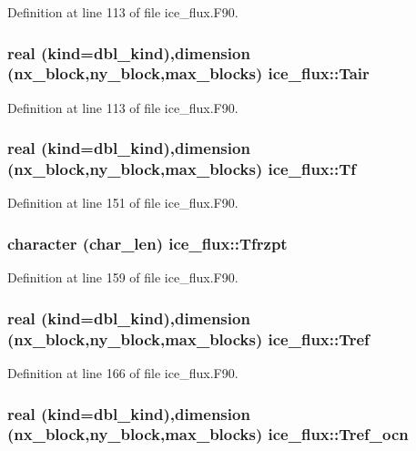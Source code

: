 Definition at line 113 of file ice\_\-flux.F90.\hypertarget{namespaceice__flux_add98ec71fa0c35dbd9a7afcfa897081d}{
\subsubsection[{Tair}]{\setlength{\rightskip}{0pt plus 5cm}real (kind=dbl\_\-kind),dimension (nx\_\-block,ny\_\-block,max\_\-blocks) {\bf ice\_\-flux::Tair}}}
\label{namespaceice__flux_add98ec71fa0c35dbd9a7afcfa897081d}


Definition at line 113 of file ice\_\-flux.F90.\hypertarget{namespaceice__flux_a3facf6772fad8bd7af98c69cd56db10c}{
\subsubsection[{Tf}]{\setlength{\rightskip}{0pt plus 5cm}real (kind=dbl\_\-kind),dimension (nx\_\-block,ny\_\-block,max\_\-blocks) {\bf ice\_\-flux::Tf}}}
\label{namespaceice__flux_a3facf6772fad8bd7af98c69cd56db10c}


Definition at line 151 of file ice\_\-flux.F90.\hypertarget{namespaceice__flux_a230173f0ff542e8f4cdc68f1c6a469f9}{
\subsubsection[{Tfrzpt}]{\setlength{\rightskip}{0pt plus 5cm}character (char\_\-len) {\bf ice\_\-flux::Tfrzpt}}}
\label{namespaceice__flux_a230173f0ff542e8f4cdc68f1c6a469f9}


Definition at line 159 of file ice\_\-flux.F90.\hypertarget{namespaceice__flux_a6a0b5fa95bab43f29f8cbd6cbd8f047f}{
\subsubsection[{Tref}]{\setlength{\rightskip}{0pt plus 5cm}real (kind=dbl\_\-kind),dimension (nx\_\-block,ny\_\-block,max\_\-blocks) {\bf ice\_\-flux::Tref}}}
\label{namespaceice__flux_a6a0b5fa95bab43f29f8cbd6cbd8f047f}


Definition at line 166 of file ice\_\-flux.F90.\hypertarget{namespaceice__flux_af9f2e55cc441e661ab391bd3c4640ce4}{
\subsubsection[{Tref\_\-ocn}]{\setlength{\rightskip}{0pt plus 5cm}real (kind=dbl\_\-kind),dimension (nx\_\-block,ny\_\-block,max\_\-blocks) {\bf ice\_\-flux::Tref\_\-ocn}}}
\label{namespaceice__flux_af9f2e55cc441e661ab391bd3c4640ce4}



